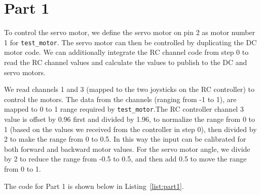 \begin{filecontents}[overwrite]{./sections/part1_list.tex}
        test_motor_pub.publish(servo_motor);

        px4_usleep(20000);
    }

    PX4_INFO("The motor will be stopped");
    test_motor.timestamp = hrt_absolute_time();
    test_motor.motor_number = DC_MOTOR;
    test_motor.value = 0.5;
    test_motor.driver_instance = 0;
    test_motor.timeout_ms = 0;

    test_motor_pub.publish(test_motor);

    PX4_INFO("The servo motor will be stopped");
    servo_motor.timestamp = hrt_absolute_time();
    servo_motor.motor_number = SERVO_MOTOR;
    servo_motor.value = 0.5;
    servo_motor.driver_instance = 0;
    servo_motor.timeout_ms = 0;

    test_motor_pub.publish(servo_motor);

    return 0;
}
\end{lstlisting}
\end{filecontents}

\section*{Part 1}

To control the servo motor, we define the servo motor on pin 2 as motor number 1 for \texttt{test\_motor}. The servo motor can then be controlled by duplicating the DC motor code. We can additionally integrate the RC channel code from step 0 to read the RC channel values and calculate the values to publish to the DC and servo motors.

We read channels 1 and 3 (mapped to the two joysticks on the RC controller) to control the motors. The data from the channels (ranging from -1 to 1), are mapped to 0 to 1 range required by \texttt{test\_motor}.The RC controller channel 3 value is offset by 0.96 first and divided by 1.96, to normalize the range from 0 to 1 (based on the values we received from the controller in step 0), then divided by 2 to make the range from 0 to 0.5. In this way the input can be calibrated for both forward and backward motor values. For the servo motor angle, we divide by 2 to reduce the range from -0.5 to 0.5, and then add 0.5 to move the range from 0 to 1.

The code for Part 1 is shown below in Listing~\ref{list:part1}.


